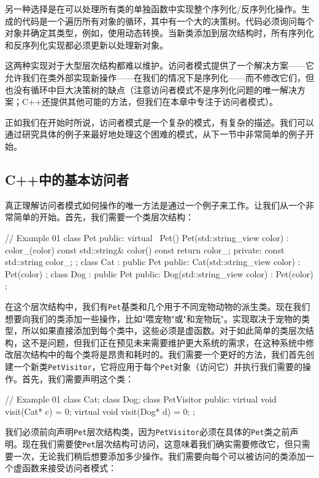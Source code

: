 另一种选择是在可以处理所有类的单独函数中实现整个序列化/反序列化操作。生成的代码是一个遍历所有对象的循环，其中有一个大的决策树。代码必须询问每个对象并确定其类型，例如，使用动态转换。当新类添加到层次结构时，所有序列化和反序列化实现都必须更新以处理新对象。

这两种实现对于大型层次结构都难以维护。访问者模式提供了一个解决方案——它允许我们在类外部实现新操作——在我们的情况下是序列化——而不修改它们，但也没有循环中巨大决策树的缺点（注意访问者模式不是序列化问题的唯一解决方案；C++还提供其他可能的方法，但我们在本章中专注于访问者模式）。

正如我们在开始时所说，访问者模式是一个复杂的模式，有复杂的描述。我们可以通过研究具体的例子来最好地处理这个困难的模式，从下一节中非常简单的例子开始。

\subsection{C++中的基本访问者}

真正理解访问者模式如何操作的唯一方法是通过一个例子来工作。让我们从一个非常简单的开始。首先，我们需要一个类层次结构：

\begin{code}
// Example 01
class Pet {
  public:
  virtual ~Pet() {}
  Pet(std::string_view color) : color_(color) {}
  const std::string& color() const { return color_; }
  private:
  const std::string color_;
};
class Cat : public Pet {
  public:
  Cat(std::string_view color) : Pet(color) {}
};
class Dog : public Pet {
  public:
  Dog(std::string_view color) : Pet(color) {}
};
\end{code}

在这个层次结构中，我们有\texttt{Pet}基类和几个用于不同宠物动物的派生类。现在我们想要向我们的类添加一些操作，比如"喂宠物"或"和宠物玩"。实现取决于宠物的类型，所以如果直接添加到每个类中，这些必须是虚函数。对于如此简单的类层次结构，这不是问题，但我们正在预见未来需要维护更大系统的需求，在这种系统中修改层次结构中的每个类将是昂贵和耗时的。我们需要一个更好的方法，我们首先创建一个新类\texttt{PetVisitor}，它将应用于每个\texttt{Pet}对象（访问它）并执行我们需要的操作。首先，我们需要声明这个类：

\begin{code}
// Example 01
class Cat;
class Dog;
class PetVisitor {
  public:
  virtual void visit(Cat* c) = 0;
  virtual void visit(Dog* d) = 0;
};
\end{code}

我们必须前向声明\texttt{Pet}层次结构类，因为\texttt{PetVisitor}必须在具体的\texttt{Pet}类之前声明。现在我们需要使\texttt{Pet}层次结构可访问，这意味着我们确实需要修改它，但只需要一次，无论我们稍后想要添加多少操作。我们需要向每个可以被访问的类添加一个虚函数来接受访问者模式：

